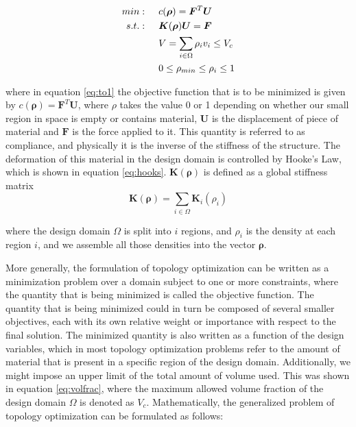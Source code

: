 \documentclass[../main.tex]{subfiles}
\begin{document}
\begin{align} 
  min: & \hspace{0.5cm} c(\bm{\rho}) = \bm{F}^T \bm{U}  \label{eq:to1} \\
  s.t.: & \hspace{0.5cm} \bm{K}(\bm{\rho})\bm{U} = \bm{F}  \label{eq:hooks}\\
        & \hspace{0.5cm} V = \sum _{i \in \Omega} \rho_i v_i \leq V_c \label{eq:volfrac} \\ 
        & \hspace{0.5cm} 0 \leq \rho_{min} \leq \rho_i \leq 1 \label{eq:to4}
\end{align}

where in equation \ref{eq:to1} the objective function that is to be minimized is given by $c(\bm{\rho}) = \bm{F}^T \bm{U}$, where $\rho$ takes the value 0 or 1 depending on whether our small region in space is empty or contains material, $\bm{U}$ is the displacement of piece of material and $\bm{F}$ is the force applied to it. This quantity is referred to as compliance, and physically it is the inverse of the stiffness of the structure. The deformation of this material in the design domain is controlled by Hooke's Law, which is shown in equation \ref{eq:hooks}. $\bm{K}(\bm{\rho})$ is defined as a global stiffness matrix \cite{hornbergerFiniteElementMethod2005}
\begin{equation}
  \bm{K}(\bm{\rho}) = \sum_{i \in \Omega} \bm{K}_i(\rho_i)
\end{equation}

where the design domain $\Omega$ is split into $i$ regions, and $\rho_i$ is the density at each region $i$, and we assemble all those densities into the vector $\bm{\rho}$. 

More generally, the formulation of topology optimization can be written as a minimization problem over a domain subject to one or more constraints, where the quantity that is being minimized is called the objective function. The quantity that is being minimized could in turn be composed of several smaller objectives, each with its own relative weight or importance with respect to the final solution. The minimized quantity is also written as a function of the design variables, which in most topology optimization problems refer to the amount of material that is present in a specific region of the design domain. Additionally, we might impose an upper limit of the total amount of volume used. This was shown in equation \ref{eq:volfrac}, where the maximum allowed volume fraction of the design domain $\Omega$ is denoted as $V_c$. Mathematically, the generalized problem of topology optimization can be formulated as follows:
\end{document}
